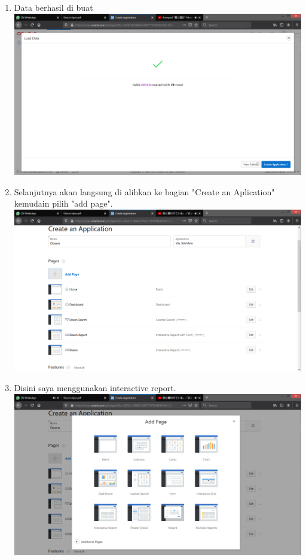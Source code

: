 \documentclass[12pt]{article}
\begin{document}
\begin{enumerate}
		\item Data berhasil di buat\\
		\includegraphics[scale=0.3]{src/13}
		\item Selanjutnya akan langsung di alihkan ke bagian "Create an Aplication" kemudain pilih "add page".\\
		\includegraphics[scale=0.3]{src/14}
		\item Disini saya menggunakan interactive report.\\
		\includegraphics[scale=0.3]{src/15}

\end{enumerate}
\end{document}
